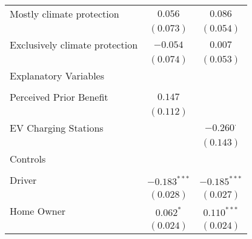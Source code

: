 \begin{center}
\begin{tiny}
\begin{longtable}{l@{} c@{} c@{}}
\quad Mostly climate protection                                                      & $0.056$          & $0.086$          \\
                                                                                     & $(0.073)$        & $(0.054)$        \\
\quad Exclusively climate protection                                                 & $-0.054$         & $0.007$          \\
                                                                                     & $(0.074)$        & $(0.053)$        \\
Explanatory Variables                                                                &                  &                  \\
                                                                                     &                  &                  \\
\quad Perceived Prior Benefit                                                        & $0.147$          &                  \\
                                                                                     & $(0.112)$        &                  \\
\quad EV Charging Stations                                                           &                  & $-0.260^{\cdot}$ \\
                                                                                     &                  & $(0.143)$        \\
Controls                                                                             &                  &                  \\
                                                                                     &                  &                  \\
\quad Driver                                                                         & $-0.183^{***}$   & $-0.185^{***}$   \\
                                                                                     & $(0.028)$        & $(0.027)$        \\
\quad Home Owner                                                                     & $0.062^{*}$      & $0.110^{***}$    \\
                                                                                     & $(0.024)$        & $(0.024)$        \\

\end{longtable}
\end{tiny}
\end{center}
